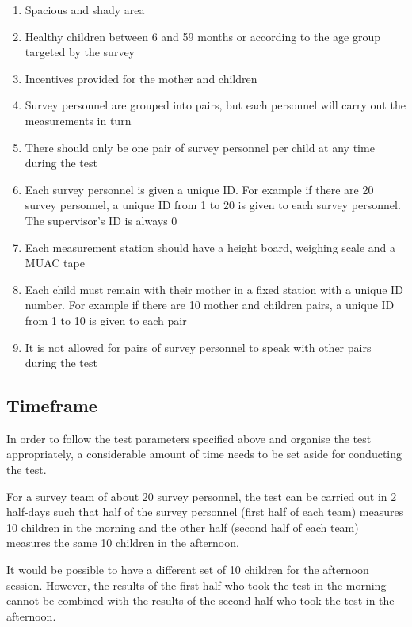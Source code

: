 \documentclass[12pt,a4paper]{book}
\theoremstyle{definition}
\theoremstyle{definition}
\theoremstyle{definition}
\theoremstyle{remark}
\begin{document}
\begin{enumerate}
\def\labelenumi{\arabic{enumi}.}
\item
  Spacious and shady area
\item
  Healthy children between 6 and 59 months or according to the age group
  targeted by the survey
\item
  Incentives provided for the mother and children
\item
  Survey personnel are grouped into pairs, but each personnel will carry
  out the measurements in turn
\item
  There should only be one pair of survey personnel per child at any
  time during the test
\item
  Each survey personnel is given a unique ID. For example if there are
  20 survey personnel, a unique ID from 1 to 20 is given to each survey
  personnel. The supervisor's ID is always 0
\item
  Each measurement station should have a height board, weighing scale
  and a MUAC tape
\item
  Each child must remain with their mother in a fixed station with a
  unique ID number. For example if there are 10 mother and children
  pairs, a unique ID from 1 to 10 is given to each pair
\item
  It is not allowed for pairs of survey personnel to speak with other
  pairs during the test
\end{enumerate}

\hypertarget{timeframe}{%
\subsection{Timeframe}\label{timeframe}}

In order to follow the test parameters specified above and organise the
test appropriately, a considerable amount of time needs to be set aside
for conducting the test.

For a survey team of about 20 survey personnel, the test can be carried
out in 2 half-days such that half of the survey personnel (first half of
each team) measures 10 children in the morning and the other half
(second half of each team) measures the same 10 children in the
afternoon.

It would be possible to have a different set of 10 children for the
afternoon session. However, the results of the first half who took the
test in the morning cannot be combined with the results of the second
half who took the test in the afternoon.
\end{document}
